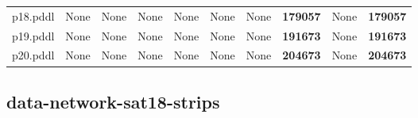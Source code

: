 \documentclass{article}
\begin{document}
\begin{tabular}{@{}lrrrrrrrrr@{}}
p18.pddl & \multicolumn{1}{|l|}{None} & \multicolumn{1}{|l|}{None} & \multicolumn{1}{|l|}{None} & \multicolumn{1}{|l|}{None} & \multicolumn{1}{|l|}{None} & \multicolumn{1}{|l|}{None} & \textbf{179057} & \multicolumn{1}{|l|}{None} & \textbf{179057} \\
p19.pddl & \multicolumn{1}{|l|}{None} & \multicolumn{1}{|l|}{None} & \multicolumn{1}{|l|}{None} & \multicolumn{1}{|l|}{None} & \multicolumn{1}{|l|}{None} & \multicolumn{1}{|l|}{None} & \textbf{191673} & \multicolumn{1}{|l|}{None} & \textbf{191673} \\
p20.pddl & \multicolumn{1}{|l|}{None} & \multicolumn{1}{|l|}{None} & \multicolumn{1}{|l|}{None} & \multicolumn{1}{|l|}{None} & \multicolumn{1}{|l|}{None} & \multicolumn{1}{|l|}{None} & \textbf{204673} & \multicolumn{1}{|l|}{None} & \textbf{204673} \\
\end{tabular}

\hypertarget{operators-data-network-sat18-strips}{}
\subsection*{data-network-sat18-strips}
\end{document}
